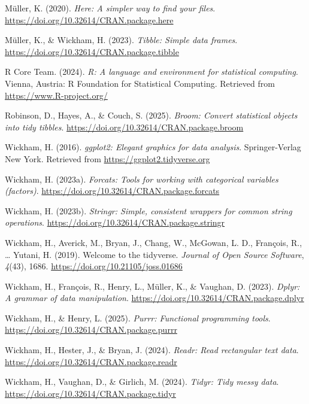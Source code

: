 \documentclass[
  ,man,floatsintext]{apa6}
\newlength{\cslhangindent}
\newenvironment{CSLReferences}[2] %
 {\begin{list}{}{%
  \setlength{\itemindent}{0pt}
  \setlength{\leftmargin}{0pt}
  \setlength{\parsep}{0pt}
  \ifodd #1
   \setlength{\leftmargin}{\cslhangindent}
   \setlength{\itemindent}{-1\cslhangindent}
  \fi
  \setlength{\itemsep}{#2\baselineskip}}}
 {\end{list}}
\begin{document}
\begin{CSLReferences}{1}{0}
Müller, K. (2020). \emph{Here: A simpler way to find your files}. \url{https://doi.org/10.32614/CRAN.package.here}

Müller, K., \& Wickham, H. (2023). \emph{Tibble: Simple data frames}. \url{https://doi.org/10.32614/CRAN.package.tibble}

R Core Team. (2024). \emph{R: A language and environment for statistical computing}. Vienna, Austria: R Foundation for Statistical Computing. Retrieved from \url{https://www.R-project.org/}

Robinson, D., Hayes, A., \& Couch, S. (2025). \emph{Broom: Convert statistical objects into tidy tibbles}. \url{https://doi.org/10.32614/CRAN.package.broom}

Wickham, H. (2016). \emph{ggplot2: Elegant graphics for data analysis}. Springer-Verlag New York. Retrieved from \url{https://ggplot2.tidyverse.org}

Wickham, H. (2023a). \emph{Forcats: Tools for working with categorical variables (factors)}. \url{https://doi.org/10.32614/CRAN.package.forcats}

Wickham, H. (2023b). \emph{Stringr: Simple, consistent wrappers for common string operations}. \url{https://doi.org/10.32614/CRAN.package.stringr}

Wickham, H., Averick, M., Bryan, J., Chang, W., McGowan, L. D., François, R., \ldots{} Yutani, H. (2019). Welcome to the {tidyverse}. \emph{Journal of Open Source Software}, \emph{4}(43), 1686. \url{https://doi.org/10.21105/joss.01686}

Wickham, H., François, R., Henry, L., Müller, K., \& Vaughan, D. (2023). \emph{Dplyr: A grammar of data manipulation}. \url{https://doi.org/10.32614/CRAN.package.dplyr}

Wickham, H., \& Henry, L. (2025). \emph{Purrr: Functional programming tools}. \url{https://doi.org/10.32614/CRAN.package.purrr}

Wickham, H., Hester, J., \& Bryan, J. (2024). \emph{Readr: Read rectangular text data}. \url{https://doi.org/10.32614/CRAN.package.readr}

Wickham, H., Vaughan, D., \& Girlich, M. (2024). \emph{Tidyr: Tidy messy data}. \url{https://doi.org/10.32614/CRAN.package.tidyr}

\end{CSLReferences}


\clearpage
\renewcommand{\listfigurename}{Figure captions}

\clearpage
\renewcommand{\listtablename}{Table captions}
\end{document}
